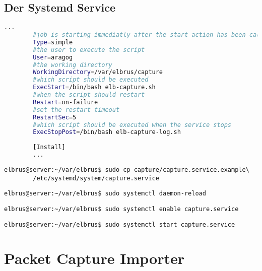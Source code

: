 \documentclass{article}
\begin{document}
	\newpage
	\subsection[systemd service]{Der Systemd Service}
	\begin{lstlisting}[caption={capture.service.example - Die Variable 'WorkingDirectory', Die Variable 'User' sowie die Variable 'ExecStopPost' anpassen.},language=bash ,keywords={WorkingDirectory, User, ExecStopPost}, keywordstyle=\color{red}, firstnumber=3]
		...
		#job is starting immediatly after the start action has been called
		Type=simple
		#the user to execute the script
		User=aragog
		#the working directory
		WorkingDirectory=/var/elbrus/capture
		#which script should be executed
		ExecStart=/bin/bash elb-capture.sh
		#when the script should restart
		Restart=on-failure
		#set the restart timeout
		RestartSec=5
		#which script should be executed when the service stops
		ExecStopPost=/bin/bash elb-capture-log.sh
		
		[Install]
		...
	\end{lstlisting}
	
	\lstset{style=commands}
	\begin{lstlisting}[caption={Kopieren des Serviceprogrammes.}]
		elbrus@server:~/var/elbrus$ sudo cp capture/capture.service.example\
		/etc/systemd/system/capture.service
	\end{lstlisting}

	\begin{lstlisting}[caption={Neuladen des 'systemctl' Deamons.}]
		elbrus@server:~/var/elbrus$ sudo systemctl daemon-reload
	\end{lstlisting}
	
	\begin{lstlisting}[caption={Aktivieren des Serviceprogrammes.}]
		elbrus@server:~/var/elbrus$ sudo systemctl enable capture.service
	\end{lstlisting}

	\begin{lstlisting}[caption={Starten des Serviceprogrammes.}]
		elbrus@server:~/var/elbrus$ sudo systemctl start capture.service
	\end{lstlisting}
	
	\newpage
	
	
	\section{Packet Capture Importer}
\end{document}
